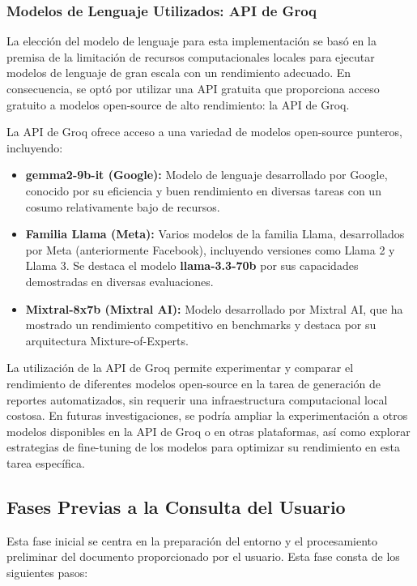 \subsubsection{Modelos de Lenguaje Utilizados: API de Groq}

La elección del modelo de lenguaje para esta implementación se basó en la premisa de la limitación de recursos computacionales locales para ejecutar modelos de lenguaje de gran escala con un rendimiento adecuado.  En consecuencia,  se optó por utilizar una API gratuita que proporciona acceso gratuito a modelos open-source de alto rendimiento: la API de Groq\cite{groq}.

La API de Groq ofrece acceso a una variedad de modelos open-source punteros,  incluyendo:

\begin{itemize}
	\item \textbf{gemma2-9b-it (Google):}  Modelo de lenguaje desarrollado por Google,  conocido por su eficiencia y buen rendimiento en diversas tareas con un cosumo relativamente bajo de recursos.
	\item \textbf{Familia Llama (Meta):}  Varios modelos de la familia Llama,  desarrollados por Meta (anteriormente Facebook),  incluyendo versiones como Llama 2 y Llama 3.  Se destaca el modelo \textbf{llama-3.3-70b} por sus capacidades demostradas en diversas evaluaciones\cite{llamavsgpt4}.
	\item \textbf{Mixtral-8x7b (Mixtral AI):}  Modelo desarrollado por Mixtral AI,  que ha mostrado un rendimiento competitivo en benchmarks y destaca por su arquitectura Mixture-of-Experts.
\end{itemize}

La utilización de la API de Groq permite experimentar y comparar el rendimiento de diferentes modelos open-source en la tarea de generación de reportes automatizados,  sin requerir una infraestructura computacional local costosa. En futuras investigaciones,  se podría ampliar la experimentación a otros modelos disponibles en la API de Groq o en otras plataformas,  así como explorar estrategias de fine-tuning de los modelos para optimizar su rendimiento en esta tarea específica.


\subsection{Fases Previas a la Consulta del Usuario}

Esta fase inicial se centra en la preparación del entorno y el procesamiento preliminar del documento proporcionado por el usuario. Esta fase consta de los siguientes pasos:

